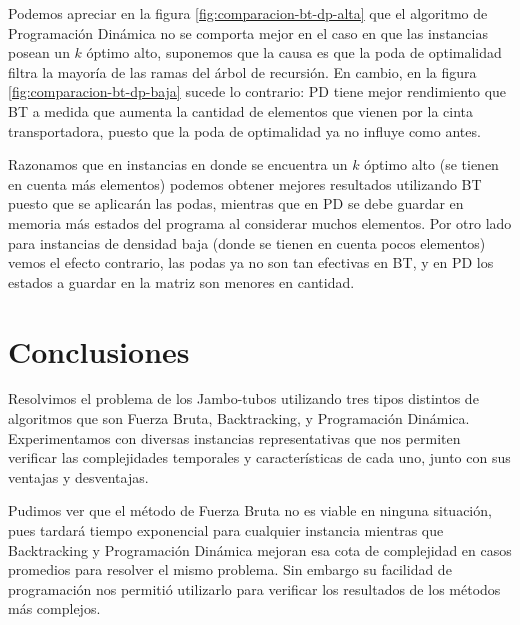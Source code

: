 \documentclass[10pt,a4paper]{article}
\begin{document}
Podemos apreciar en la figura \ref{fig:comparacion-bt-dp-alta} que el algoritmo de Programación Dinámica no se comporta mejor en el caso en que las instancias posean un $k$ óptimo alto, suponemos que la causa es que la poda de optimalidad filtra la mayoría de las ramas del árbol de recursión.
En cambio, en la figura \ref{fig:comparacion-bt-dp-baja} sucede lo contrario: PD tiene mejor rendimiento que BT a medida que aumenta la cantidad de elementos que vienen por la cinta transportadora, puesto que la poda de optimalidad ya no influye como antes.

Razonamos que en instancias en donde se encuentra un $k$ óptimo alto (se tienen en cuenta más elementos) podemos obtener mejores resultados utilizando BT puesto que se aplicarán las podas, mientras que en PD se debe guardar en memoria más estados del programa al considerar muchos elementos. Por otro lado para instancias de densidad baja (donde se tienen en cuenta pocos elementos) vemos el efecto contrario, las podas ya no son tan efectivas en BT, y en PD los estados a guardar en la matriz son menores en cantidad.

\newpage

\section{Conclusiones} \label{sec:conclusiones}
Resolvimos el problema de los Jambo-tubos utilizando tres tipos distintos de algoritmos que son Fuerza Bruta, Backtracking, y Programación Dinámica. Experimentamos con diversas instancias representativas que nos permiten verificar las complejidades temporales y características de cada uno, junto con sus ventajas y desventajas.

Pudimos ver que el método de Fuerza Bruta no es viable en ninguna situación, pues tardará tiempo exponencial para cualquier instancia mientras que Backtracking y Programación Dinámica mejoran esa cota de complejidad en casos promedios para resolver el mismo problema. Sin embargo su facilidad de programación nos permitió utilizarlo para verificar los resultados de los métodos más complejos.
\end{document}
